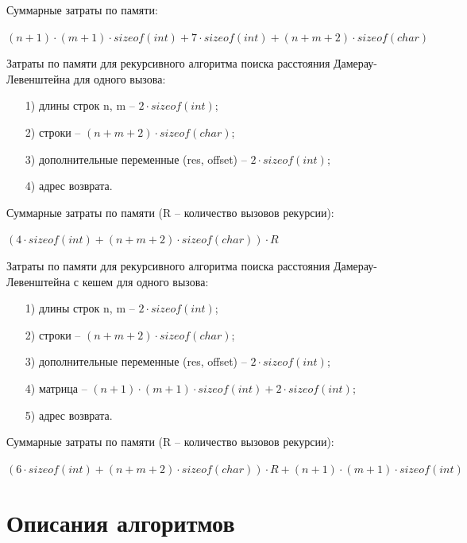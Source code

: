 \documentclass[a4paper,14pt, unknownkeysallowed]{extreport}
\begin{document}
	Суммарные затраты по памяти:
	
	$(n + 1) \cdot (m + 1) \cdot sizeof(int) + 7 \cdot sizeof(int) + (n + m + 2) \cdot sizeof(char)$\newline

    \clearpage
    
	Затраты по памяти для рекурсивного алгоритма поиска расстояния Дамерау-Левенштейна для одного вызова:
	
	\begin{enumerate}
	\item[1)] длины строк n, m -- $2 \cdot sizeof(int)$;
	\item[2)] строки -- $(n + m + 2) \cdot sizeof(char)$;
	\item[3)] дополнительные переменные (res, offset) -- $2 \cdot sizeof(int)$; 
	\item[4)] адрес возврата.
	\end{enumerate}
	
	Суммарные затраты по памяти (R -- количество вызовов рекурсии):
	
	$(4 \cdot sizeof(int) + (n + m + 2) \cdot sizeof(char)) \cdot R$\newline
	
	Затраты по памяти для рекурсивного алгоритма поиска расстояния Дамерау-Левенштейна с кешем для одного вызова:
	
	\begin{enumerate}
	\item[1)] длины строк n, m -- $2 \cdot sizeof(int)$;
	\item[2)] строки -- $(n + m + 2) \cdot sizeof(char)$;
	\item[3)] дополнительные переменные (res, offset) -- $2 \cdot sizeof(int)$; 
	\item[4)] матрица -- $(n + 1) \cdot (m + 1) \cdot sizeof(int) + 2 \cdot sizeof(int)$;
	\item[5)] адрес возврата.
	\end{enumerate}
	
	Суммарные затраты по памяти (R -- количество вызовов рекурсии):
	
	$(6 \cdot sizeof(int) + (n + m + 2) \cdot sizeof(char)) \cdot R + (n + 1) \cdot (m + 1) \cdot sizeof(int)$\newline
	
	\section{Описания алгоритмов}
	
\end{document}

